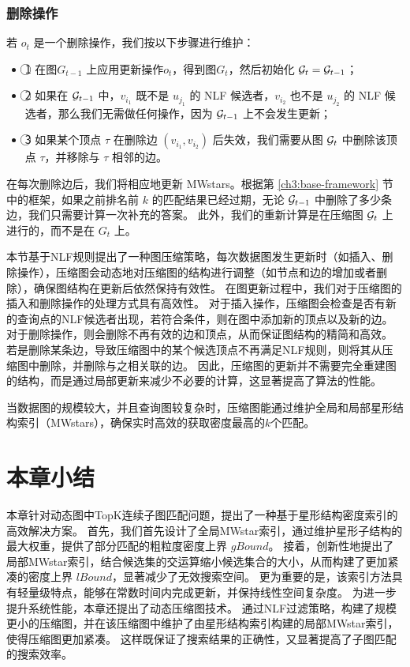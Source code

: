 \subsubsection{删除操作}
若 $o_t$ 是一个删除操作，我们按以下步骤进行维护：
\begin{itemize}
\item \textcircled{1} 在图$G_{t-1}$ 上应用更新操作$o_t$，得到图$G_t$，然后初始化 $\mathcal{G}_t = \mathcal{G}_{t-1}$；
\item \textcircled{2} 如果在 $\mathcal{G}_{t-1}$ 中，$v_{i_1}$ 既不是 $u_{j_1}$ 的 NLF 候选者，$v_{i_2}$ 也不是 $u_{j_2}$ 的 NLF 候选者，那么我们无需做任何操作，因为 $\mathcal{G}_{t-1}$ 上不会发生更新；
\item \textcircled{3} 如果某个顶点 $\tau$ 在删除边 $(v_{i_1}, v_{i_2})$ 后失效，我们需要从图 $\mathcal{G}_t$ 中删除该顶点 $\tau$，并移除与 $\tau$ 相邻的边。
\end{itemize}

在每次删除边后，我们将相应地更新 MWstars。根据第 \ref{ch3:base-framework} 节中的框架，如果之前排名前 $k$ 的匹配结果已经过期，无论 $\mathcal{G}_{t-1}$ 中删除了多少条边，我们只需要计算一次补充的答案。
此外，我们的重新计算是在压缩图 $\mathcal{G}_t$ 上进行的，而不是在 $G_t$ 上。


本节基于NLF规则提出了一种图压缩策略，每次数据图发生更新时（如插入、删除操作），压缩图会动态地对压缩图的结构进行调整（如节点和边的增加或者删除），确保图结构在更新后依然保持有效性。
在图更新过程中，我们对于压缩图的插入和删除操作的处理方式具有高效性。
对于插入操作，压缩图会检查是否有新的查询点的NLF候选者出现，若符合条件，则在图中添加新的顶点以及新的边。
对于删除操作，则会删除不再有效的边和顶点，从而保证图结构的精简和高效。
若是删除某条边，导致压缩图中的某个候选顶点不再满足NLF规则，则将其从压缩图中删除，并删除与之相关联的边。
因此，压缩图的更新并不需要完全重建图的结构，而是通过局部更新来减少不必要的计算，这显著提高了算法的性能。

当数据图的规模较大，并且查询图较复杂时，压缩图能通过维护全局和局部星形结构索引（MWstars），确保实时高效的获取密度最高的$k$个匹配。

\section{本章小结}
本章针对动态图中TopK连续子图匹配问题，提出了一种基于星形结构密度索引的高效解决方案。
首先，我们首先设计了全局MWstar索引，通过维护星形子结构的最大权重，提供了部分匹配的粗粒度密度上界 $gBound$。
接着，创新性地提出了局部MWstar索引，结合候选集的交运算缩小候选集合的大小，从而构建了更加紧凑的密度上界 $lBound$，显著减少了无效搜索空间。
更为重要的是，该索引方法具有轻量级特点，能够在常数时间内完成更新，并保持线性空间复杂度。
为进一步提升系统性能，本章还提出了动态压缩图技术。
通过NLF过滤策略，构建了规模更小的压缩图，并在该压缩图中维护了由星形结构索引构建的局部MWstar索引，使得压缩图更加紧凑。
这样既保证了搜索结果的正确性，又显著提高了子图匹配的搜索效率。
